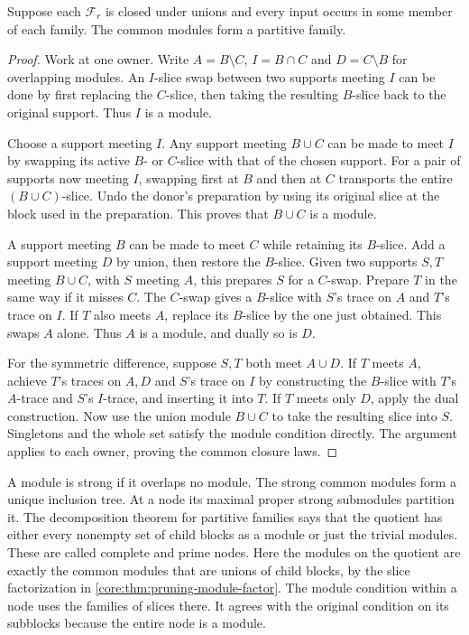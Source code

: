 \begin{theorem}
\label{core:thm:pruning-modules-partitive}
Suppose each $\mathcal F_r$ is closed under unions and every input
occurs in some member of each family. The common modules form a
partitive family.
\end{theorem}
\begin{proof}
Work at one owner. Write $A=B\setminus C$, $I=B\cap C$ and
$D=C\setminus B$ for overlapping modules. An $I$-slice swap between
two supports meeting $I$ can be done by first replacing the
$C$-slice, then taking the resulting $B$-slice back to the original
support. Thus $I$ is a module.

Choose a support meeting $I$. Any support meeting $B\cup C$ can
be made to meet $I$ by swapping its active $B$- or $C$-slice with
that of the chosen support. For a pair of supports now meeting $I$,
swapping first at $B$ and then at $C$ transports the entire
$(B\cup C)$-slice. Undo the donor's preparation by using its
original slice at the block used in the preparation. This proves
that $B\cup C$ is a module.

A support meeting $B$ can be made to meet $C$ while retaining its
$B$-slice. Add a support meeting $D$ by union, then restore the
$B$-slice. Given two supports $S,T$ meeting $B\cup C$, with $S$
meeting $A$, this prepares $S$ for a $C$-swap. Prepare $T$ in the
same way if it misses $C$. The $C$-swap gives a $B$-slice with
$S$'s trace on $A$ and $T$'s trace on $I$. If $T$ also meets $A$,
replace its $B$-slice by the one just obtained. This swaps $A$ alone.
Thus $A$ is a module, and dually so is $D$.

For the symmetric difference, suppose $S,T$ both meet $A\cup D$.
If $T$ meets $A$, achieve $T$'s traces on $A,D$ and $S$'s trace
on $I$ by constructing the $B$-slice with $T$'s $A$-trace and $S$'s
$I$-trace, and inserting it into $T$. If $T$ meets only $D$, apply
the dual construction. Now use the union module $B\cup C$ to
take the resulting slice into $S$. Singletons and the whole set
satisfy the module condition directly. The argument applies to
each owner, proving the common closure laws.
\end{proof}

A module is strong if it overlaps no module. The strong common
modules form a unique inclusion tree. At a node its maximal proper
strong submodules partition it. The decomposition theorem for
partitive families \cite{CheinHabibMaurer1981} says that the quotient
has either every nonempty set of child blocks as a module or just
the trivial modules. These are called complete and prime nodes.
Here the modules on the quotient are exactly the common modules
that are unions of child blocks, by the slice factorization in
\cref{core:thm:pruning-module-factor}. The module condition within a
node uses the families of slices there. It agrees with the original
condition on its subblocks because the entire node is a module.

